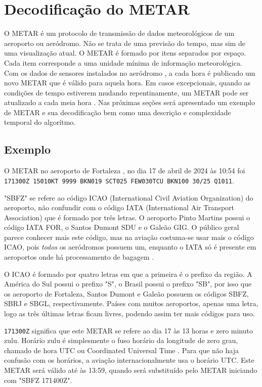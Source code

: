 \chapter{Decodificação do METAR}

O METAR é um protocolo de transmissão de dados meteorológicos de um aeroporto ou aeródromo. Não se trata de 
uma previsão do tempo, mas sim de uma visualização atual. O METAR é formado por itens separados por espaço. 
Cada item corresponde a uma unidade mínima de informação meteorológica. Com os dados de sensores instalados 
no aeródromo \cite{metar-weather-gov}, a cada hora é publicado um novo METAR que é válido para aquela hora. 
Em casos excepcionais, quando as condições de tempo estiverem mudando repentinamente, um METAR pode ser atualizado 
a cada meia hora \cite{METAR-speci}. Nas próximas seções será apresentado um exemplo de METAR e sua 
decodificação bem como uma descrição e complexidade temporal do algorítmo.

\section{Exemplo}
O METAR no aeroporto de Fortaleza \cite{METAR-sbfz}, no dia 17 de abril de 2024 às 10:54 foi
\texttt{171300Z 15010KT 9999 BKN019 SCT025 FEW030TCU BKN100 30/25 Q1011}.

"SBFZ" se refere ao código ICAO (International Civil Aviation Organization) do aeroporto, não confundir 
com o código IATA (International Air Transport Association) que é formado por três letras. O aeroporto Pinto 
Martins possui o código IATA FOR, o Santos Dumont SDU e o Galeão GIG. O público geral parece conhecer mais este 
código, mas na aviação costuma-se usar mais o código ICAO, pois \textit{todos} os aeródromos possuem um, 
enquanto o IATA só é presente em aeroportos onde há processamento de bagagem \cite{iata-codes} \cite{icao-codes}.

O ICAO é formado por quatro letras em que a primeira é o prefixo da região. A América do Sul possui o prefixo "S", 
o Brasil possui o prefixo "SB", por isso que os aeroporto de Fortaleza, Santos Dumont e Galeão possuem os códigos 
SBFZ, SBRJ e SBGL, respectivamente. Países com muitos aeroportos, apenas uma letra, 
logo as três últimas letras ficam livres, podendo assim ter mais códigos para uso.

\texttt{171300Z} significa que este METAR se refere ao dia 17 às 13 horas e zero minuto zulu. Horário zulu é 
simplesmente o fuso horário da longitude de zero grau, chamado de hora UTC ou Coordinated Universal Time \cite{UTC}. 
Para que não haja confusão com os horários, a aviação internacionalmente usa o horário UTC. Este METAR será 
válido até às 13:59, quando será substituído pelo METAR iniciando com "SBFZ 171400Z".

